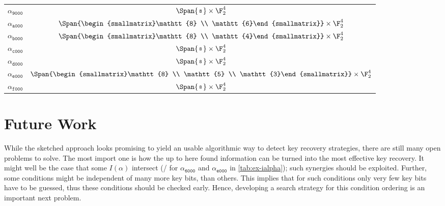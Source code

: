 {\begin{tabular}{cc}
        $\alpha_{\mathtt{9000}}$ & $\Span{\begin{smallmatrix}\mathtt{8}\end{smallmatrix}} \times \F_2^4$ \\
        $\alpha_{\mathtt{a000}}$ & $\Span{\begin{smallmatrix}\mathtt{8} \\ \mathtt{6}\end{smallmatrix}} \times \F_2^4$ \\
        $\alpha_{\mathtt{b000}}$ & $\Span{\begin{smallmatrix}\mathtt{8} \\ \mathtt{4}\end{smallmatrix}} \times \F_2^4$ \\
        $\alpha_{\mathtt{c000}}$ & $\Span{\begin{smallmatrix}\mathtt{8}\end{smallmatrix}} \times \F_2^4$ \\
        $\alpha_{\mathtt{d000}}$ & $\Span{\begin{smallmatrix}\mathtt{8}\end{smallmatrix}} \times \F_2^4$ \\
        $\alpha_{\mathtt{e000}}$ & $\Span{\begin{smallmatrix}\mathtt{8} \\ \mathtt{5} \\ \mathtt{3}\end{smallmatrix}} \times \F_2^4$ \\
        $\alpha_{\mathtt{f000}}$ & $\Span{\begin{smallmatrix}\mathtt{8}\end{smallmatrix}} \times \F_2^4$ \\
        \bottomrule
    \end{tabular}
}

\section{Future Work}

While the sketched approach looks promising to yield an usable algorithmic way to detect key recovery strategies, there are still many open problems to solve.
The most import one is how the up to here found information can be turned into the most effective key recovery.
It might well be the case that some $I(\alpha)$ intersect (\eg/ for $\alpha_{\mathtt{6000}}$ and $\alpha_{\mathtt{e000}}$ in \cref{tab:ex-ialpha}); such synergies should be exploited.
Further, some conditions might be independent of many more key bits, than others.
This implies that for such conditions only very few key bits have to be guessed, thus these conditions should be checked early.
Hence, developing a search strategy for this condition ordering is an important next problem.


